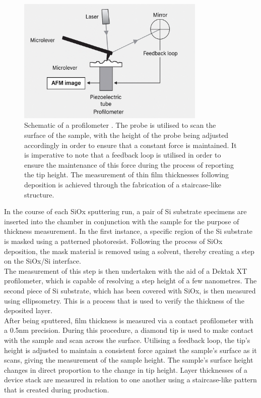\begin{figure}[htbp!] 
    \centering    
    \includegraphics[width=0.8\textwidth]{Chapter3/Figs/c.png}
    \caption[Contact profilometer for thin film thickness measurements.]{Schematic of a profilometer \cite{mabilleau2008vitro}. The probe is utilised to scan the surface of the sample, with the height of the probe being adjusted accordingly in order to ensure that a constant force is maintained. It is imperative to note that a feedback loop is utilised in order to ensure the maintenance of this force during the process of reporting the tip height. The measurement of thin film thicknesses following deposition is achieved through the fabrication of a staircase-like structure.}
    \label{fig:3c}
\end{figure}

\noindent In the course of each SiOx sputtering run, a pair of Si substrate specimens are inserted into the chamber in conjunction with the sample for the purpose of thickness measurement. In the first instance, a specific region of the Si substrate is masked using a patterned photoresist. Following the process of SiOx deposition, the mask material is removed using a solvent, thereby creating a step on the SiOx/Si interface. \\

\noindent The measurement of this step is then undertaken with the aid of a Dektak XT profilometer, which is capable of resolving a step height of a few nanometres. The second piece of Si substrate, which has been covered with SiOx, is then measured using ellipsometry. This is a process that is used to verify the thickness of the deposited layer.\\

\noindent After being sputtered, film thickness is measured via a contact profilometer with a 0.5nm precision. During this procedure, a diamond tip is used to make contact with the sample and scan across the surface. Utilising a feedback loop, the tip's height is adjusted to maintain a consistent force against the sample's surface as it scans, giving the measurement of the sample height. The sample's surface height changes in direct proportion to the change in tip height. Layer thicknesses of a device stack are measured in relation to one another using a staircase-like pattern that is created during production. 

